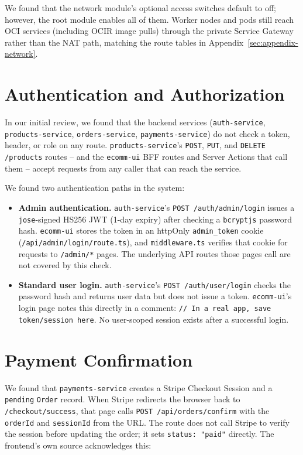 We found that the network module's optional access switches default to off;
however, the root module enables all of them. Worker nodes and pods still reach OCI services (including
OCIR image pulls) through the private Service Gateway rather than the NAT path,
matching the route tables in Appendix~\ref{sec:appendix-network}.

\section{Authentication and Authorization}\label{sec:sec-app-auth}
\begin{warningbox}
In our initial review, we found that the backend services (\texttt{auth-service}, \texttt{products-service},
\texttt{orders-service}, \texttt{payments-service}) do not check a token, header, or
role on any route. \texttt{products-service}'s \texttt{POST}, \texttt{PUT}, and
\texttt{DELETE /products} routes -- and the \texttt{ecomm-ui} BFF routes and Server
Actions that call them -- accept requests from any caller that can reach the
service.
\end{warningbox}

We found two authentication paths in the system:

\begin{itemize}[leftmargin=1.4em]
  \item \textbf{Admin authentication.} \texttt{auth-service}'s \texttt{POST
        /auth/admin/login} issues a \texttt{jose}-signed HS256 JWT (1-day expiry)
        after checking a \texttt{bcryptjs} password hash. \texttt{ecomm-ui} stores
        the token in an httpOnly \texttt{admin\_token} cookie
        (\texttt{/api/admin/login/route.ts}), and \texttt{middleware.ts} verifies
        that cookie for requests to \texttt{/admin/*} pages. The underlying API
        routes those pages call are not covered by this check.
  \item \textbf{Standard user login.} \texttt{auth-service}'s \texttt{POST
        /auth/user/login} checks the password hash and returns user data but does
        not issue a token. \texttt{ecomm-ui}'s login page notes this directly in a
        comment: \texttt{// In a real app, save token/session here}. No
        user-scoped session exists after a successful login.
\end{itemize}

\section{Payment Confirmation}\label{sec:sec-payments}
We found that \texttt{payments-service} creates a Stripe Checkout Session and a
\texttt{pending} \texttt{Order} record. When Stripe redirects the browser back to
\texttt{/checkout/success}, that page calls \texttt{POST /api/orders/confirm} with
the \texttt{orderId} and \texttt{sessionId} from the URL. The route does not call
Stripe to verify the session before updating the order; it sets \texttt{status:
"paid"} directly. The frontend's own source acknowledges this:


